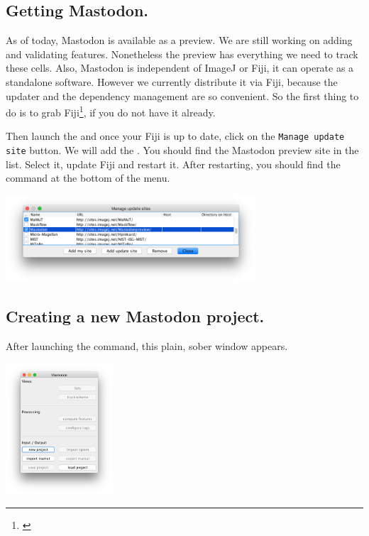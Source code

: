 \subsection{Getting Mastodon.}

As of today, Mastodon is available as a preview. We are still working on adding and validating features.
Nonetheless the preview has everything we need to track these cells.
Also, Mastodon is independent of ImageJ or Fiji, it can operate as a standalone software. 
However we currently distribute it via Fiji, because the updater and the dependency management are so convenient. 
So the first thing to do is to grab Fiji\footnote{\href{http://fiji.sc/}{}}, if you do not have it already.

Then launch the  and once your Fiji is up to date, click on the \texttt{Manage update site} button.
We will add the .
You should find the Mastodon preview site in the list. 
Select it, update Fiji and restart it. 
After restarting, you should find the command  at the bottom of the menu.

\begin{center}
    \includegraphics[width=0.7\textwidth]{figures/Mastodon_UpdateSite.png}
\end{center}



\subsection{Creating a new Mastodon project.}

After launching the command, this plain, sober window appears.
\begin{center}
         \includegraphics[width=0.3\textwidth]{figures/Mastodon_MainWindow.png}
\end{center}

